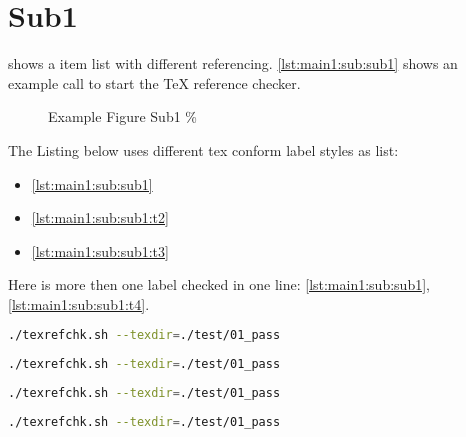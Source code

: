 \section[Sub1]{Sub1}\label{main1:sub:sub1}

 shows a item list with different referencing. \autoref{lst:main1:sub:sub1} shows an example call to start the TeX reference checker.


\begin{figure}[!ht]
    \caption[{Main1; Sub; Sub1}]{Example Figure Sub1 \%}\label{fig:main1:sub:sub1}  %
\end{figure}


The Listing below uses different tex conform label styles as list:
\begin{itemize}
    \item \ref{lst:main1:sub:sub1}
    \item \ref{lst:main1:sub:sub1:t2}
    \item \ref{lst:main1:sub:sub1:t3}
\end{itemize}

Here is more then one label checked in one line: \ref{lst:main1:sub:sub1}, \ref{lst:main1:sub:sub1:t4}.


\begin{lstlisting}[language=bash,caption={Start texrefchk (Label Typ 1)}, label={lst:main1:sub:sub1}]
./texrefchk.sh --texdir=./test/01_pass
\end{lstlisting}


\begin{lstlisting}[language=bash, label =lst:main1:sub:sub1:t2, caption={Start texrefchk (Label Typ 2)}, ]
./texrefchk.sh --texdir=./test/01_pass
\end{lstlisting}


\begin{lstlisting}[language=bash, label=lst:main1:sub:sub1:t3, caption={Start texrefchk (Label Typ 3)}]
./texrefchk.sh --texdir=./test/01_pass
\end{lstlisting}


\begin{lstlisting}[language=bash, label = lst:main1:sub:sub1:t4, caption={Start texrefchk (Label Typ 4)}]
./texrefchk.sh --texdir=./test/01_pass
\end{lstlisting}



%
%
%

